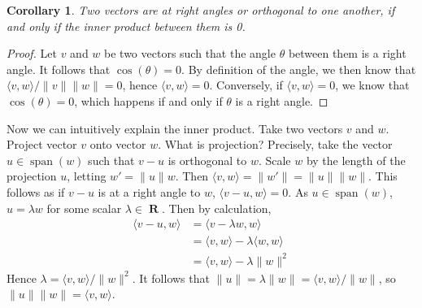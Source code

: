 \documentclass{report}
\newtheorem{corollary}[theorem]{Corollary}
\DeclareMathOperator{\real}{\mathbf{R}}
\DeclareMathOperator{\spn}{span}
\begin{document}
\begin{corollary}
  Two vectors are at right angles or orthogonal to one another, if and only if the inner product between them is 0.
\end{corollary}
\begin{proof}
  Let $v$ and $w$ be two vectors such that the angle $\theta$ between them is a right angle. It follows that $\cos(\theta) = 0$. By definition of the angle, we then know that $\langle v, w \rangle/\|v\|\|w\| = 0$, hence $\langle v, w \rangle = 0$. Conversely, if $\langle v, w \rangle = 0$, we know that $\cos(\theta) = 0$, which happens if and only if $\theta$ is a right angle.
\end{proof}

Now we can intuitively explain the inner product. Take two vectors $v$ and $w$. Project vector $v$ onto vector $w$. What is projection? Precisely, take the vector $u \in \spn(w)$ such that $v - u$ is orthogonal to $w$. Scale $w$ by the length of the projection $u$, letting $w' = \|u\| w$. Then $\langle v, w \rangle = \| w' \| = \| u \| \| w \|$. This follows as if $v - u$ is at a right angle to $w$, $\langle v - u, w \rangle = 0$. As $u \in \spn(w)$, $u = \lambda w$ for some scalar $\lambda \in \real$. Then by calculation,
%
\begin{align*}
  \langle v - u, w \rangle &= \langle v - \lambda w, w \rangle\\
                           &= \langle v, w \rangle - \lambda \langle w, w \rangle\\
                           &= \langle v, w \rangle - \lambda \|w\|^2
\end{align*}
%
Hence $\lambda = \langle v, w \rangle/\|w\|^2$. It follows that $\|u\| = \lambda \| w \| = \langle v, w \rangle/\|w\|$, so $\|u\|\|w\| = \langle v, w \rangle$.

\begin{center}
\end{center}
\end{document}
